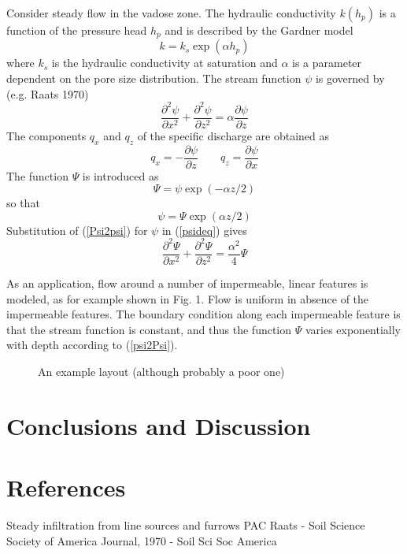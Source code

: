 \documentclass{elsart}
\begin{document}
Consider steady flow in the vadose zone. The hydraulic conductivity $k(h_p)$ is a function of the pressure head $h_p$ and is described by the Gardner model
\begin{equation}
k = k_s \exp(\alpha h_p)
\end{equation}
where $k_s$ is the hydraulic conductivity at saturation and $\alpha$ is a parameter dependent on the pore size distribution. The stream function $\psi$ is governed by (e.g. Raats 1970)
\begin{equation} \label{psideq}
\frac{ \partial^2\psi }{\partial x^2} + \frac{ \partial^2\psi }{\partial z^2}  = \alpha \frac{ \partial\psi }{\partial z} 
\end{equation}
The components $q_x$ and $q_z$ of the specific discharge are obtained as
\begin{equation}
q_x = -\frac{\partial\psi}{\partial z} \qquad q_z = \frac{\partial\psi}{\partial x}
\end{equation}
The function $\Psi$ is introduced as 
\begin{equation}\label{psi2Psi}
\Psi = \psi\exp(-\alpha z/2)
\end{equation} so that  
\begin{equation} \label{Psi2psi}
\psi = \Psi \exp(\alpha z / 2)
\end{equation}
Substitution of (\ref{Psi2psi}) for $\psi$ in (\ref{psideq}) gives
\begin{equation} \label{psideq}
\frac{ \partial^2\Psi }{\partial x^2} + \frac{ \partial^2\Psi }{\partial z^2}  = \frac{\alpha^2}{4} \Psi
\end{equation}

As an application, flow around a number of impermeable, linear features is modeled, as for example shown in Fig. 1. Flow is uniform in absence of the impermeable features. The boundary condition along each impermeable feature is that the stream function is constant, and thus the function $\Psi$ varies exponentially with depth according to (\ref{psi2Psi}). 

\begin{figure}
\centering
  \caption{An example layout (although probably a poor one)}
  \label{Fig6}
\end{figure} 

\section{Conclusions and Discussion}

\section{References}

Steady infiltration from line sources and furrows
PAC Raats - Soil Science Society of America Journal, 1970 - Soil Sci Soc America



\end{document}
